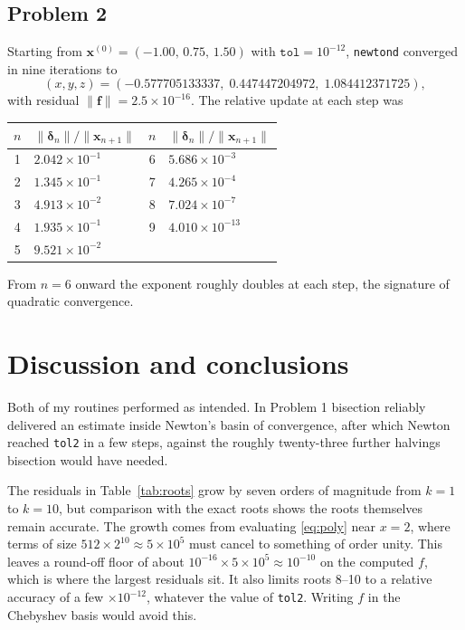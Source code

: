 \documentclass[11pt]{article}
\begin{document}
\subsection{Problem 2}

Starting from $\mathbf{x}^{(0)} = (-1.00,\, 0.75,\, 1.50)$ with
$\texttt{tol} = 10^{-12}$, \texttt{newtond} converged in nine iterations to
%
\begin{equation}
(x, y, z) = (-0.577705133337,\; 0.447447204972,\; 1.084412371725) ,
\label{eq:root3d}
\end{equation}
%
with residual $\|\mathbf{f}\| = 2.5 \times 10^{-16}$. The relative update at
each step was
%
\begin{center}
\begin{tabular}{cl@{\qquad\qquad}cl}
\toprule
$n$ & $\|\boldsymbol{\delta}_n\|/\|\mathbf{x}_{n+1}\|$ &
$n$ & $\|\boldsymbol{\delta}_n\|/\|\mathbf{x}_{n+1}\|$ \\
\midrule
1 & $2.042 \times 10^{-1}$ & 6 & $5.686 \times 10^{-3}$  \\
2 & $1.345 \times 10^{-1}$ & 7 & $4.265 \times 10^{-4}$  \\
3 & $4.913 \times 10^{-2}$ & 8 & $7.024 \times 10^{-7}$  \\
4 & $1.935 \times 10^{-1}$ & 9 & $4.010 \times 10^{-13}$ \\
5 & $9.521 \times 10^{-2}$ &   &                         \\
\bottomrule
\end{tabular}
\end{center}
%
From $n = 6$ onward the exponent roughly doubles at each step, the signature of
quadratic convergence.

\section{Discussion and conclusions}
\label{sec:discussion}

Both of my routines performed as intended. In Problem 1 bisection reliably
delivered an estimate inside Newton's basin of convergence, after which Newton
reached \texttt{tol2} in a few steps, against the roughly twenty-three further
halvings bisection would have needed.

The residuals in Table~\ref{tab:roots} grow by seven orders of magnitude from
$k = 1$ to $k = 10$, but comparison with the exact roots shows the roots
themselves remain accurate. The growth comes from evaluating \eqref{eq:poly}
near $x = 2$, where terms of size $512 \times 2^{10} \approx 5\times10^5$ must
cancel to something of order unity. This leaves a round-off floor of about
$10^{-16} \times 5\times10^5 \approx 10^{-10}$ on the computed $f$, which is
where the largest residuals sit. It also limits roots 8--10 to a relative accuracy of a few $\times 10^{-12}$, whatever the value of \texttt{tol2}. Writing $f$ in the Chebyshev basis would avoid
this.
\end{document}
